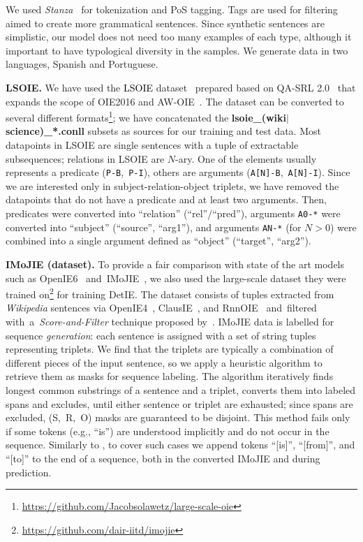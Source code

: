 \documentclass[letterpaper]{article} \usepackage{aaai22}  \usepackage{times}  \usepackage{helvet}  \usepackage{courier}  \usepackage[hyphens]{url}  \usepackage{graphicx} \usepackage{placeins}
\newcommand{\camera}[1]{\textcolor{black}{#1}}
\begin{document}
We used \emph{Stanza}~\cite{qi2020stanza} for tokenization and PoS tagging. Tags are used for filtering aimed to create more grammatical sentences. Since synthetic sentences are simplistic, our model does not need too many examples of each type, although it important to have typological diversity in the samples. We generate data in two languages, Spanish and Portuguese.



\textbf{LSOIE.}
We have used the \camera{LSOIE} dataset~\cite{lsoie-2021} prepared based on QA-SRL 2.0~\cite{fitzgerald2018large} that expands the scope of OIE2016 and AW-OIE~\cite{stanovsky-etal-2018-supervised}.
The dataset can be converted to several different formats\footnote{\url{https://github.com/Jacobsolawetz/large-scale-oie}}; we have concatenated the \textbf{ lsoie\_(wiki$\vert$science)\_*.conll} subsets as sources for our training and test data. Most datapoints in LSOIE are single sentences with a tuple of extractable subsequences; relations in LSOIE are $N$-ary. One of the elements usually represents a predicate ({\tt P-B},~{\tt P-I}), others are arguments ({\tt A[N]-B},~{\tt A[N]-I}). 
Since we are interested only in subject-relation-object triplets, we have removed the datapoints that do not have a predicate and at least two arguments. Then, predicates
were converted into ``relation'' (``rel''/``pred''), arguments 
{\tt A0-*} 
were converted into ``subject'' (``source'', ``arg1''), and  arguments {\tt AN-*} (for $N>0$) were combined
into a single argument defined as ``object'' (``target'', ``arg2''). 

\textbf{IMoJIE (dataset).}
To provide a fair comparison with state of the art models such as OpenIE6~\cite{kolluru2020openie6} and~IMoJIE~\cite{kolluru2020imojie}, we also used the large-scale dataset they were trained on\footnote{\url{https://github.com/dair-iitd/imojie}} for training DetIE. The dataset consists of tuples extracted from \emph{Wikipedia} sentences via OpenIE4~\cite{christensen2011analysis}, ClausIE~\cite{del2013clausie}, and RnnOIE~\cite{stanovsky-etal-2018-supervised} and~filtered with~a~\textit{Score-and-Filter} technique proposed by~\citet{kolluru2020imojie}.
IMoJIE data is labelled for sequence \textit{generation}: each sentence is assigned with a set of string tuples representing triplets. We find that the triplets are typically
a combination of different pieces of the input sentence, so we apply a heuristic algorithm to retrieve them as masks for sequence labeling.
The algorithm iteratively finds longest common substrings of a sentence and a triplet, converts them into labeled spans and excludes, until either sentence or triplet are exhausted; since spans are excluded, (S,~R,~O) masks are guaranteed to be disjoint. 
This method fails only if some tokens (e.g., ``is'') are understood implicitly and do not occur in the sequence.
Similarly to \citet{kolluru2020openie6}, to cover such cases we append tokens ``[is]'', ``[from]'', and ``[to]'' to the end of a sequence, both in the converted IMoJIE and during prediction.
\end{document}
